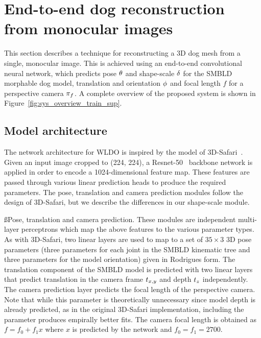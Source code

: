 \section{End-to-end dog reconstruction from monocular images} 

This section describes a technique for reconstructing a 3D dog mesh from a single, monocular image. This is achieved using an end-to-end convolutional neural network, which predicts pose $\theta$ and shape-scale $\delta$ for the SMBLD morphable dog model, translation and orientation $\phi$ and focal length $f$ for a perspective camera $\pi_{f}$. A complete overview of the proposed system is shown in Figure~\ref{fig:sys_overview_train_sup}.


\subsection{Model architecture}

The network architecture for WLDO is inspired by the model of 3D-Safari~\cite{Zuffi19Safari}. Given an input image cropped to (224, 224), a Resnet-50~\cite{he2016deep} backbone network is applied in order to encode a 1024-dimensional feature map. These features are passed through various linear prediction heads to produce the required parameters. The pose, translation and camera prediction modules follow the design of 3D-Safari, but we describe the differences in our shape-scale module.

\ss{Pose, translation and camera prediction.}
These modules are independent multi-layer perceptrons which map the above features to the various parameter types. As with 3D-Safari, two linear layers are used to map to a set of $35 \times 3$ 3D pose parameters (three parameters for each joint in the SMBLD kinematic tree and three parameters for the model orientation) given in Rodrigues form. The translation component of the SMBLD model is predicted with two linear layers that predict translation in the camera frame $t_{x,y}$ and depth $t_{z}$ independently. The camera prediction layer predicts the focal length of the perspective camera. Note that while this parameter is theoretically unnecessary since model depth is already predicted, as in the original 3D-Safari implementation, including the parameter produces empirally better fits. The camera focal length is obtained as $f = f_{0} + f_{1}x$ where $x$ is predicted by the network and $f_{0} = f_{1} = 2700$.

